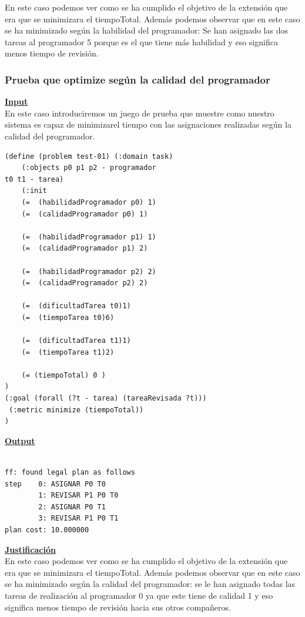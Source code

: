 \documentclass[11pt]{article}
\begin{document}
En este caso podemos ver como se ha cumplido el objetivo de la extensión que era que se minimizara el tiempoTotal. Además podemos observar que en este caso se ha minimizado según la habilidad del programador: Se han asignado las dos tareas al programador 5 porque es el que tiene más habilidad y eso significa menos tiempo de revisión.

\subsubsection{Prueba que optimize según la calidad del programador} 
\underline{\textbf{Input}}
\\

En este caso introduciremos un juego de prueba que muestre como nuestro sistema es capaz de minimizarel tiempo con las asignaciones realizadas según la calidad del programador. 
\medskip
\begin{verbatim}
(define (problem test-01) (:domain task) 
	(:objects p0 p1 p2 - programador
t0 t1 - tarea)
	(:init
	(=  (habilidadProgramador p0) 1)
	(=  (calidadProgramador p0) 1)

	(=  (habilidadProgramador p1) 1)
	(=  (calidadProgramador p1) 2)

	(=  (habilidadProgramador p2) 2)
	(=  (calidadProgramador p2) 2)

	(=  (dificultadTarea t0)1)
	(=  (tiempoTarea t0)6)

	(=  (dificultadTarea t1)1)
	(=  (tiempoTarea t1)2)

	(= (tiempoTotal) 0 )
)
(:goal (forall (?t - tarea) (tareaRevisada ?t)))
 (:metric minimize (tiempoTotal))
)
\end{verbatim}

\noindent \underline{\textbf{Output}}
\\

\begin{verbatim}

ff: found legal plan as follows
step    0: ASIGNAR P0 T0
        1: REVISAR P1 P0 T0
        2: ASIGNAR P0 T1
        3: REVISAR P1 P0 T1
plan cost: 10.000000
\end{verbatim}

\medskip


\noindent \underline{\textbf{Justificación}}
\\

En este caso podemos ver como se ha cumplido el objetivo de la extensión que era que se minimizara el tiempoTotal. Además podemos observar que en este caso se ha minimizado según la calidad del programador: se le han asignado todas las tareas de realización al programador 0 ya que este tiene de calidad 1 y eso significa menos tiempo de revisión hacia sus otros compañeros. 
\end{document}
